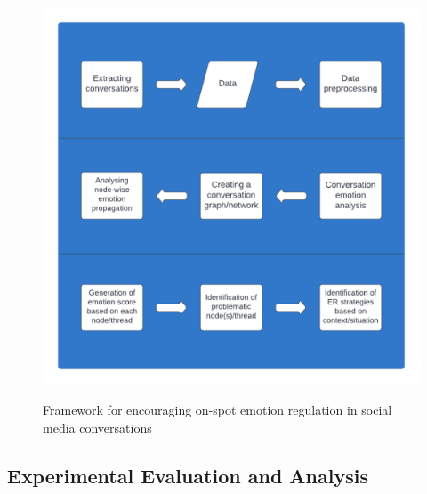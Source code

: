 \begin{figure}[h]
  
    \centering
    \includegraphics[width=12cm,height=12cm,keepaspectratio]{framework.pdf}
  \caption{Framework for encouraging on-spot emotion regulation in social media conversations}
  \label{fig:Framework}
  \end{figure}  
\subsection{Experimental Evaluation and Analysis}

 

